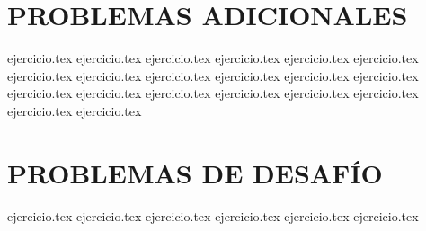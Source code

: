 \section*{PROBLEMAS ADICIONALES}
\begin{enumerate}
    \setcounter{enumi}{31}
    {ejercicio.tex}
    {ejercicio.tex}
    {ejercicio.tex}
    {ejercicio.tex}
    {ejercicio.tex}
    {ejercicio.tex}
    {ejercicio.tex}
    {ejercicio.tex}
    {ejercicio.tex}
    {ejercicio.tex}
    {ejercicio.tex}
    {ejercicio.tex}
    {ejercicio.tex}
    {ejercicio.tex}
    {ejercicio.tex}
    {ejercicio.tex}
    {ejercicio.tex}
    {ejercicio.tex}
    {ejercicio.tex}
    {ejercicio.tex}
\end{enumerate}

\section*{PROBLEMAS DE DESAFÍO}
\begin{enumerate}
    \setcounter{enumi}{51}
    {ejercicio.tex}
    {ejercicio.tex}
    {ejercicio.tex}
    {ejercicio.tex}
    {ejercicio.tex}
    {ejercicio.tex}
\end{enumerate}
